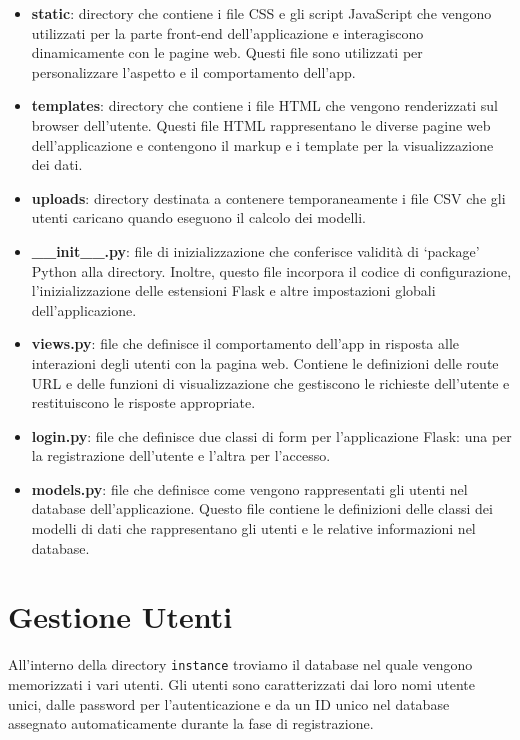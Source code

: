 \documentclass{rapportECL}
\begin{document}
\begin{itemize}
  \item \textbf{static}: directory che contiene i file CSS e gli script JavaScript che vengono utilizzati per la parte front-end dell'applicazione 
  e interagiscono dinamicamente con le pagine web. Questi file sono utilizzati per personalizzare l'aspetto e il comportamento dell'app.
  \item \textbf{templates}: directory che contiene  i file HTML che vengono renderizzati sul browser dell'utente. Questi file HTML rappresentano 
  le diverse pagine web dell'applicazione e contengono il markup e i template per la visualizzazione dei dati.
  \item \textbf{uploads}: directory destinata a contenere temporaneamente i file CSV che gli utenti caricano quando eseguono il calcolo dei modelli. 
  \item \textbf{\_\_init\_\_.py}: file di inizializzazione che conferisce validità di `package' Python alla directory. 
  Inoltre, questo file incorpora il codice di configurazione, l'inizializzazione delle estensioni Flask e altre impostazioni globali dell'applicazione.
  \item \textbf{views.py}: file che definisce il comportamento dell'app in risposta alle interazioni degli utenti con la pagina web. Contiene le definizioni 
  delle route URL e delle funzioni di visualizzazione che gestiscono le richieste dell'utente e restituiscono le risposte appropriate.
  \item \textbf{login.py}: file che definisce due classi di form per l'applicazione Flask: una per la registrazione dell'utente e l'altra per l'accesso.
  \item \textbf{models.py}: file che definisce come vengono rappresentati gli utenti nel database dell'applicazione. Questo file contiene le definizioni 
  delle classi dei modelli di dati che rappresentano gli utenti e le relative informazioni nel database.
\end{itemize}


\section{Gestione Utenti}
All'interno della directory \texttt{instance} troviamo il database nel quale vengono memorizzati i vari utenti. Gli utenti
sono caratterizzati dai loro nomi utente unici, dalle password per l'autenticazione e da un ID unico nel database assegnato 
automaticamente durante la fase di registrazione.
\end{document}
